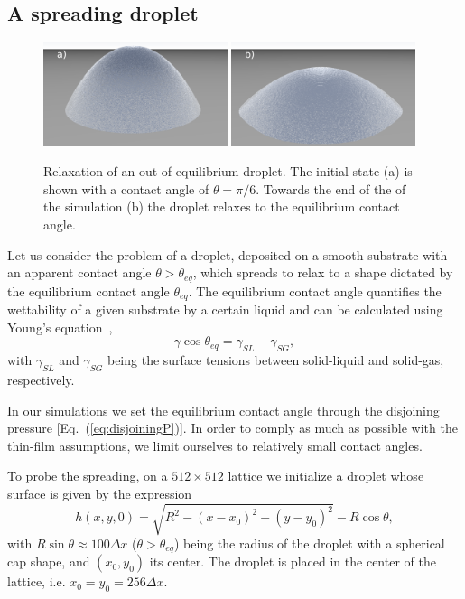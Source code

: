 \subsection{A spreading droplet}
\begin{figure}
    \centering
    \includegraphics[width=0.48\textwidth]{graphics/Fig_4_1_new_drop_a).png}
    \includegraphics[width=0.48\textwidth]{graphics/Fig_4_2_new_drop_b).png}
    \caption{Relaxation of an out-of-equilibrium droplet. 
    The initial state (a) is shown with a contact angle of $\theta = \pi/6$. 
    Towards the end of the of the simulation (b) the droplet relaxes to the equilibrium contact angle.}
    \label{fig:drop_contour}
\end{figure}

Let us consider the problem of a droplet, deposited on a smooth substrate with an apparent contact angle $\theta > \theta_{eq}$, which spreads to relax to a shape dictated by the equilibrium contact angle $\theta_{eq}$.
The equilibrium contact angle quantifies the wettability of a given substrate by a certain liquid and can be calculated using Young's equation~\cite{degennesWettingStaticsDynamics1985},
\begin{equation}\label{eq:Young}
    \gamma \cos\theta_{eq} = \gamma_{SL} - \gamma_{SG} ,
\end{equation}
with $\gamma_{SL}$ and $\gamma_{SG}$ being the surface tensions between solid-liquid and solid-gas, respectively. 

In our simulations we set the equilibrium contact angle through the disjoining pressure [Eq.~(\ref{eq:disjoiningP})].
In order to comply as much as possible with the thin-film assumptions, we limit ourselves to relatively small contact angles.

To probe the spreading, on a $512\times 512$ lattice we initialize a droplet whose surface is given by the expression
\begin{equation}
    h(x,y,0) = \sqrt{R^2 - (x-x_0)^2 - (y-y_0)^2} - R\cos\theta,
\end{equation}
with $R\sin\theta \approx 100\Delta x$  ($\theta>\theta_{eq}$) being the radius of the droplet with a spherical cap shape, and $(x_0,y_0)$ its center. 
The droplet is placed in the center of the lattice, i.e. $x_0 = y_0 = 256\Delta x$.  

